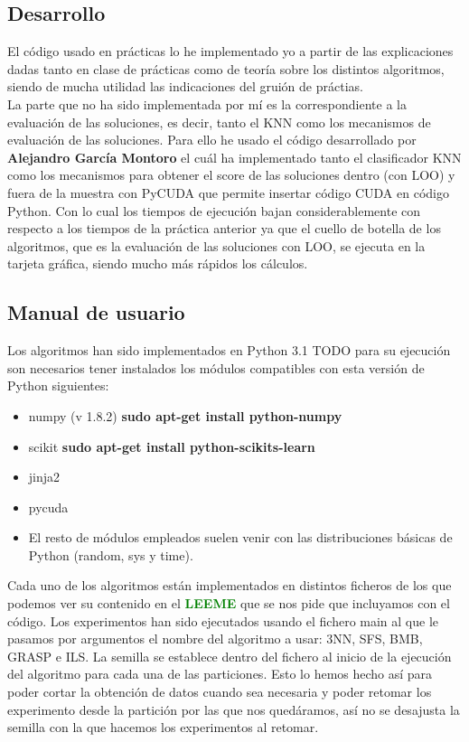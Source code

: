 \documentclass[10pt,a4paper]{article}
\begin{document}
\subsection{\color[rgb]{0.0,0.0,0.51}Desarrollo}

El código usado en prácticas lo he implementado yo a partir de las explicaciones dadas tanto en clase de prácticas como de teoría sobre los distintos algoritmos, siendo de mucha utilidad las indicaciones del gruión de práctias.\\

La parte que no ha sido implementada por mí es la correspondiente a la evaluación de las soluciones, es decir, tanto el KNN como los mecanismos de evaluación de las soluciones. Para ello he usado el código desarrollado por \textbf{Alejandro García Montoro} el cuál ha implementado tanto el clasificador KNN como los mecanismos para obtener el score de las soluciones dentro (con LOO) y fuera de la muestra con PyCUDA que permite insertar código CUDA en código Python. Con lo cual los tiempos de ejecución bajan considerablemente con respecto a los tiempos de la práctica anterior ya que el cuello de botella de los algoritmos, que es la evaluación de las soluciones con LOO, se ejecuta en la tarjeta gráfica, siendo mucho más rápidos los cálculos.\\

\subsection{\color[rgb]{0.0,0.0,0.51}Manual de usuario}
Los algoritmos han sido implementados en Python 3.1 TODO para su ejecución son necesarios tener instalados los módulos compatibles con esta versión de Python siguientes:\\

\begin{itemize}
\item numpy (v 1.8.2) \textbf{sudo apt-get install python-numpy}
\item scikit \textbf{sudo apt-get install python-scikits-learn}
\item jinja2
\item pycuda
\item El resto de módulos empleados suelen venir con las distribuciones básicas de Python (random, sys y time).
\end{itemize}

Cada uno de los algoritmos están implementados en distintos ficheros de los que podemos ver su contenido en el \textbf{\textcolor{green}{LEEME}} que se nos pide que incluyamos con el código. Los experimentos han sido ejecutados usando el fichero main al que le pasamos por argumentos el nombre del algoritmo a usar: 3NN, SFS, BMB, GRASP e ILS. La semilla se establece dentro del fichero al inicio de la ejecución del algoritmo para cada una de las particiones. Esto lo hemos hecho así para poder cortar la obtención de datos cuando sea necesaria y poder retomar los experimento desde la partición por las que nos quedáramos, así no se desajusta la semilla con la que hacemos los experimentos al retomar.\\
\end{document}
